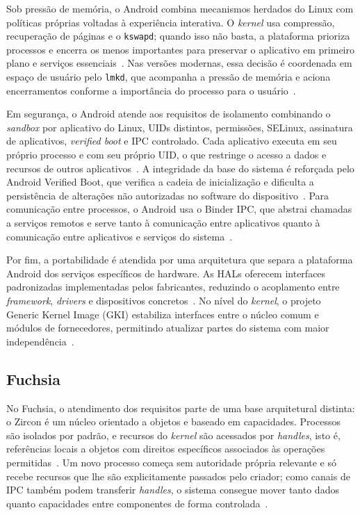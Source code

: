 \documentclass[12pt,a4paper]{article}
\begin{document}
Sob pressão de memória, o Android combina mecanismos herdados do Linux com
políticas próprias voltadas à experiência interativa. O \emph{kernel} usa
compressão, recuperação de páginas e o \texttt{kswapd}; quando isso não basta, a
plataforma prioriza processos e encerra os menos importantes para preservar o
aplicativo em primeiro plano e serviços essenciais~\cite{android_memory_mgmt}.
Nas versões modernas, essa decisão é coordenada em espaço de usuário pelo
\texttt{lmkd}, que acompanha a pressão de memória e aciona encerramentos conforme
a importância do processo para o usuário~\cite{android_lmkd}.

Em segurança, o Android atende aos requisitos de isolamento combinando o
\emph{sandbox} por aplicativo do Linux, UIDs distintos, permissões, SELinux,
assinatura de aplicativos, \emph{verified boot} e IPC controlado. Cada aplicativo
executa em seu próprio processo e com seu próprio UID, o que restringe o acesso a
dados e recursos de outros aplicativos~\cite{android_app_sandbox,android_selinux}.
A integridade da base do sistema é reforçada pelo Android Verified Boot, que
verifica a cadeia de inicialização e dificulta a persistência de alterações não
autorizadas no software do dispositivo~\cite{android_avb}. Para comunicação entre
processos, o Android usa o Binder IPC, que abstrai chamadas a serviços remotos e
serve tanto à comunicação entre aplicativos quanto à comunicação entre
aplicativos e serviços do sistema~\cite{binder_overview}.

Por fim, a portabilidade é atendida por uma arquitetura que separa a plataforma
Android dos serviços específicos de hardware. As HALs oferecem interfaces
padronizadas implementadas pelos fabricantes, reduzindo o acoplamento entre
\emph{framework}, \emph{drivers} e dispositivos concretos~\cite{android_arch}.
No nível do \emph{kernel}, o projeto Generic Kernel Image (GKI) estabiliza
interfaces entre o núcleo comum e módulos de fornecedores, permitindo atualizar
partes do sistema com maior independência~\cite{android_gki}.

\subsection{Fuchsia}

No Fuchsia, o atendimento dos requisitos parte de uma base arquitetural distinta:
o Zircon é um núcleo orientado a objetos e baseado em capacidades. Processos são
isolados por padrão, e recursos do \emph{kernel} são acessados por
\emph{handles}, isto é, referências locais a objetos com direitos específicos
associados às operações permitidas~\cite{fuchsia_secure,zircon_intro}. Um novo
processo começa sem autoridade própria relevante e só recebe recursos que lhe são
explicitamente passados pelo criador; como canais de IPC também podem transferir
\emph{handles}, o sistema consegue mover tanto dados quanto capacidades entre
componentes de forma controlada~\cite{fuchsia_sandboxing,zircon_intro}.
\end{document}
